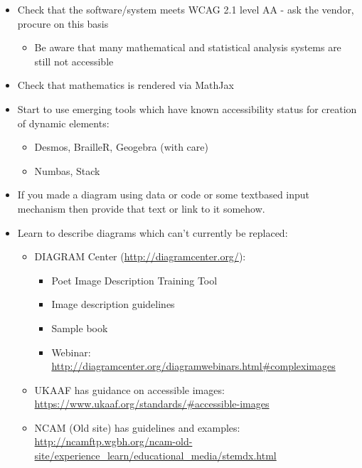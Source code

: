 \documentclass[
  10pt,
  a4paper]{article}
\providecommand{\tightlist}{%
  \setlength{\itemsep}{0pt}\setlength{\parskip}{0pt}}
\begin{document}
\begin{itemize}
\tightlist
\item
  Check that the software/system meets WCAG 2.1 level AA - ask the vendor, procure on this basis

  \begin{itemize}
  \tightlist
  \item
    Be aware that many mathematical and statistical analysis systems are still not accessible
  \end{itemize}
\item
  Check that mathematics is rendered via MathJax
\item
  Start to use emerging tools which have known accessibility status for creation of dynamic elements:

  \begin{itemize}
  \tightlist
  \item
    Desmos, BrailleR, Geogebra (with care)
  \item
    Numbas, Stack
  \end{itemize}
\item
  If you made a diagram using data or code or some textbased input mechanism then provide that text or link to it somehow.
\item
  Learn to describe diagrams which can't currently be replaced:

  \begin{itemize}
  \tightlist
  \item
    DIAGRAM Center (\url{http://diagramcenter.org/}):

    \begin{itemize}
    \tightlist
    \item
      Poet Image Description Training Tool
    \item
      Image description guidelines
    \item
      Sample book
    \item
      Webinar: \url{http://diagramcenter.org/diagramwebinars.html\#compleximages}
    \end{itemize}
  \item
    UKAAF has guidance on accessible images: \url{https://www.ukaaf.org/standards/\#accessible-images}
  \item
    NCAM (Old site) has guidelines and examples: \url{http://ncamftp.wgbh.org/ncam-old-site/experience_learn/educational_media/stemdx.html}
  \end{itemize}
\end{itemize}
\end{document}
